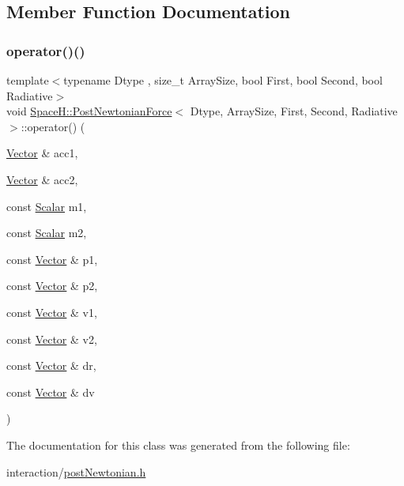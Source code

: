 \subsection{Member Function Documentation}
\mbox{\label{class_space_h_1_1_post_newtonian_force_ae22b34213f69af6bf9b5732c284afc17}} 
\subsubsection{\texorpdfstring{operator()()}{operator()()}}
{\footnotesize\ttfamily template$<$typename Dtype , size\+\_\+t Array\+Size, bool First, bool Second, bool Radiative$>$ \\
void \mbox{\hyperlink{class_space_h_1_1_post_newtonian_force}{Space\+H\+::\+Post\+Newtonian\+Force}}$<$ Dtype, Array\+Size, First, Second, Radiative $>$\+::operator() (\begin{DoxyParamCaption}\item[{\mbox{\hyperlink{class_space_h_1_1_post_newtonian_force_ae9a942fc7a0c5fa260d7e8a17cb107bd}{Vector}} \&}]{acc1,  }\item[{\mbox{\hyperlink{class_space_h_1_1_post_newtonian_force_ae9a942fc7a0c5fa260d7e8a17cb107bd}{Vector}} \&}]{acc2,  }\item[{const \mbox{\hyperlink{class_space_h_1_1_post_newtonian_force_a4c47b7292998ddda142216f6b614bedd}{Scalar}}}]{m1,  }\item[{const \mbox{\hyperlink{class_space_h_1_1_post_newtonian_force_a4c47b7292998ddda142216f6b614bedd}{Scalar}}}]{m2,  }\item[{const \mbox{\hyperlink{class_space_h_1_1_post_newtonian_force_ae9a942fc7a0c5fa260d7e8a17cb107bd}{Vector}} \&}]{p1,  }\item[{const \mbox{\hyperlink{class_space_h_1_1_post_newtonian_force_ae9a942fc7a0c5fa260d7e8a17cb107bd}{Vector}} \&}]{p2,  }\item[{const \mbox{\hyperlink{class_space_h_1_1_post_newtonian_force_ae9a942fc7a0c5fa260d7e8a17cb107bd}{Vector}} \&}]{v1,  }\item[{const \mbox{\hyperlink{class_space_h_1_1_post_newtonian_force_ae9a942fc7a0c5fa260d7e8a17cb107bd}{Vector}} \&}]{v2,  }\item[{const \mbox{\hyperlink{class_space_h_1_1_post_newtonian_force_ae9a942fc7a0c5fa260d7e8a17cb107bd}{Vector}} \&}]{dr,  }\item[{const \mbox{\hyperlink{class_space_h_1_1_post_newtonian_force_ae9a942fc7a0c5fa260d7e8a17cb107bd}{Vector}} \&}]{dv }\end{DoxyParamCaption})\hspace{0.3cm}{\ttfamily [inline]}}



The documentation for this class was generated from the following file\+:\begin{DoxyCompactItemize}
\item 
interaction/\mbox{\hyperlink{post_newtonian_8h}{post\+Newtonian.\+h}}\end{DoxyCompactItemize}
